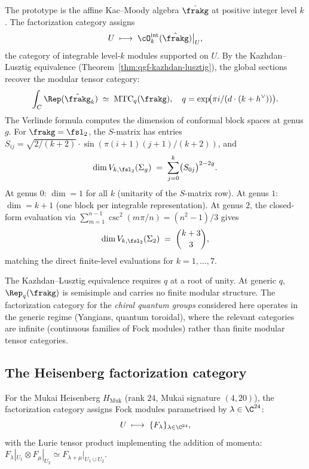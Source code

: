 The prototype is the affine Kac--Moody algebra $\hat{\frakg}$ at positive integer level $k$. The factorization category assigns
\[
 U \;\longmapsto\; \cO_k^{\mathrm{int}}(\hat{\frakg})\big|_U,
\]
the category of integrable level-$k$ modules supported on $U$. By the Kazhdan--Lusztig equivalence (Theorem~\ref{thm:qgf-kazhdan-lusztig}), the global sections recover the modular tensor category:
\[
 \int_C \Rep(\hat{\frakg}_k) \;\simeq\; \mathrm{MTC}_q(\frakg),
 \quad q = \exp\!\bigl(\pi i / (d \cdot (k + h^\vee))\bigr).
\]
The Verlinde formula computes the dimension of conformal block spaces at genus $g$. For $\frakg = \fsl_2$, the $S$-matrix has entries $S_{ij} = \sqrt{2/(k+2)} \cdot \sin(\pi(i+1)(j+1)/(k+2))$, and
\begin{equation}
\label{eq:verlinde-sl2}
 \dim V_{k, \fsl_2}(\Sigma_g)
 \;=\;
 \sum_{j=0}^{k} \bigl(S_{0j}\bigr)^{2-2g}.
\end{equation}
At genus $0$: $\dim = 1$ for all $k$ (unitarity of the $S$-matrix row). At genus $1$: $\dim = k+1$ (one block per integrable representation). At genus $2$, the closed-form evaluation via $\sum_{m=1}^{n-1} \csc^2(m\pi/n) = (n^2-1)/3$ gives
\[
 \dim V_{k, \fsl_2}(\Sigma_2) \;=\; \binom{k+3}{3},
\]
matching the direct finite-level evaluations for $k = 1,\ldots,7$.

\begin{remark}
\label{rem:factcat-root-of-unity}
The Kazhdan--Lusztig equivalence requires $q$ at a root of unity. At generic $q$, $\Rep_q(\frakg)$ is semisimple and carries no finite modular structure. The factorization category for the \emph{chiral quantum groups} considered here operates in the generic regime (Yangians, quantum toroidal), where the relevant categories are infinite (continuous families of Fock modules) rather than finite modular tensor categories.
\end{remark}


\subsection{The Heisenberg factorization category}
\label{subsec:heisenberg-factorization-category}

For the Mukai Heisenberg $H_{\mathrm{Muk}}$ (rank $24$, Mukai signature $(4,20)$), the factorization category assigns Fock modules parametrised by $\lambda \in \C^{24}$:
\[
 U \;\longmapsto\; \{F_\lambda\}_{\lambda \in \C^{24}},
\]
with the Lurie tensor product implementing the addition of momenta: $F_\lambda|_{U_1} \otimes F_\mu|_{U_2} \simeq F_{\lambda + \mu}|_{U_1 \cup U_2}$.

